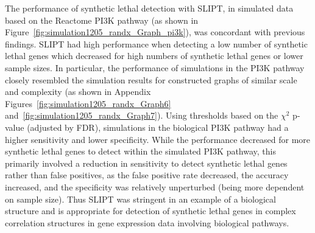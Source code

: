 The performance of \gls{synthetic lethal} detection with \gls{SLIPT}, in simulated  data based on the Reactome PI3K pathway (as shown in Figure~\ref{fig:simulation1205_randx_Graph_pi3k}), was concordant with previous findings. \gls{SLIPT} had high performance when detecting a low number of \gls{synthetic lethal} genes which decreased for high numbers of \gls{synthetic lethal} genes or lower sample sizes. In particular, the performance of simulations in the PI3K pathway closely resembled the simulation results for constructed \glspl{graph} of similar scale and complexity (as shown in Appendix Figures~\ref{fig:simulation1205_randx_Graph6} and~\ref{fig:simulation1205_randx_Graph7}). Using thresholds based on the $\chi^2$ p-value (adjusted by \gls{FDR}), simulations in the biological PI3K pathway had a higher sensitivity and lower specificity. While the performance decreased for more \gls{synthetic lethal} genes to detect within the simulated PI3K pathway, this primarily involved a reduction in sensitivity to detect \gls{synthetic lethal} genes rather than false positives, as the false positive rate decreased, the accuracy increased, and the specificity was relatively unperturbed (being more dependent on sample size). Thus \gls{SLIPT} was stringent in an example of a biological  structure and is appropriate for detection of \gls{synthetic lethal} genes in complex correlation structures in \gls{gene expression} data involving biological pathways. 

